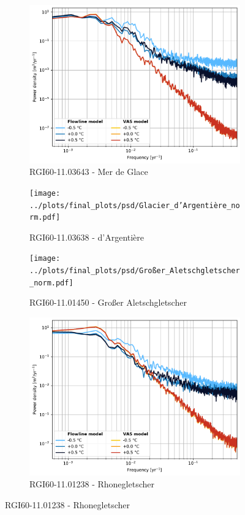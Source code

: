 \begin{figure}[htp]
        \begin{subfigure}[b]{0.48\textwidth}
          \caption{RGI60-11.03643 - Mer de Glace}
          \label{fig:psd:mer_de_glace}
          \centering
          \includegraphics[width=\textwidth]{../plots/final_plots/psd/Mer_de_Glace_norm.pdf}
        \end{subfigure}
        \hfill
        \begin{subfigure}[b]{0.48\textwidth}
          \caption{RGI60-11.03638 - d'Argentière}
          \label{fig:psd:glacier_d_argentiere}
          \centering
          \texttt{[image: ../plots/final\_plots/psd/Glacier\_d'Argentière\_norm.pdf]}
        \end{subfigure}
        \begin{subfigure}[b]{0.48\textwidth}
          \caption{RGI60-11.01450 - Großer Aletschgletscher}
          \label{fig:psd:großer_aletschgletscher}
          \centering
          \texttt{[image: ../plots/final\_plots/psd/Großer\_Aletschgletscher\_norm.pdf]}
        \end{subfigure}
        \hfill
        \begin{subfigure}[b]{0.48\textwidth}
          \caption{RGI60-11.01238 - Rhonegletscher}
          \label{fig:psd:rhonegletscher}
          \centering
          \includegraphics[width=\textwidth]{../plots/final_plots/psd/Rhonegletscher_norm.pdf}

\end{subfigure}
\end{figure}
